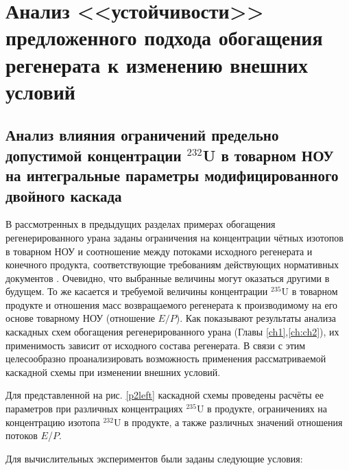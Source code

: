 
\section{Анализ <<устойчивости>> предложенного подхода обогащения регенерата к изменению внешних условий}
\subsection{Анализ влияния ограничений предельно допустимой концентрации $^{232}$U в товарном НОУ на интегральные параметры модифицированного двойного каскада}

В рассмотренных в предыдущих разделах примерах обогащения регенерированного урана заданы ограничения на концентрации чётных изотопов в товарном НОУ и соотношение между потоками исходного регенерата и конечного продукта, соответствующие требованиям действующих нормативных документов  \cite{smirnovEvolutionIsotopicComposition2012,smirnovKaskadnyeShemyZadachah2012}. Очевидно, что выбранные величины могут оказаться другими в будущем. То же касается и требуемой величины концентрации $^{235}$U в товарном продукте и отношения масс возвращаемого регенерата к производимому на его основе товарному НОУ (отношение $E/P$). Как показывают результаты анализа каскадных схем обогащения регенерированного урана (Главы \ref{ch1},\ref{ch:ch2}), их применимость зависит от исходного состава регенерата. В связи с этим целесообразно проанализировать возможность применения рассматриваемой каскадной схемы при изменении внешних условий.

Для представленной на рис. \ref{p2left} каскадной схемы проведены расчёты ее параметров при различных концентрациях $^{235}$U в продукте, ограничениях на концентрацию изотопа $^{232}$U в продукте, а также различных значений отношения потоков $E$/$P$.

Для вычислительных экспериментов были заданы следующие условия:


